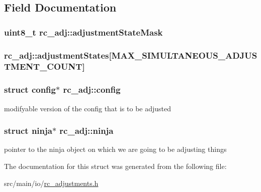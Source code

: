 \subsection{Field Documentation}
\hypertarget{structrc__adj_af323ddc49c950bc0bc5c6b8824348905}{
\subsubsection[{adjustment\+State\+Mask}]{\setlength{\rightskip}{0pt plus 5cm}uint8\+\_\+t rc\+\_\+adj\+::adjustment\+State\+Mask}}\label{structrc__adj_af323ddc49c950bc0bc5c6b8824348905}
\hypertarget{structrc__adj_aefc3e31564b873a0173db503b41cbee2}{
\subsubsection[{adjustment\+States}]{ rc\+\_\+adj\+::adjustment\+States\mbox{[}{\bf M\+A\+X\+\_\+\+S\+I\+M\+U\+L\+T\+A\+N\+E\+O\+U\+S\+\_\+\+A\+D\+J\+U\+S\+T\+M\+E\+N\+T\+\_\+\+C\+O\+U\+N\+T}\mbox{]}}}\label{structrc__adj_aefc3e31564b873a0173db503b41cbee2}
\hypertarget{structrc__adj_a67490d070d72cb52199910458655f778}{
\subsubsection[{config}]{\setlength{\rightskip}{0pt plus 5cm}struct {\bf config}$\ast$ rc\+\_\+adj\+::config}}\label{structrc__adj_a67490d070d72cb52199910458655f778}


modifyable version of the config that is to be adjusted 

\hypertarget{structrc__adj_a854aade86258255234829cb9e49c0980}{
\subsubsection[{ninja}]{\setlength{\rightskip}{0pt plus 5cm}struct {\bf ninja}$\ast$ rc\+\_\+adj\+::ninja}}\label{structrc__adj_a854aade86258255234829cb9e49c0980}


pointer to the ninja object on which we are going to be adjusting things 



The documentation for this struct was generated from the following file\+:\begin{DoxyCompactItemize}
\item 
src/main/io/\hyperlink{io_2rc__adjustments_8h}{rc\+\_\+adjustments.\+h}\end{DoxyCompactItemize}
